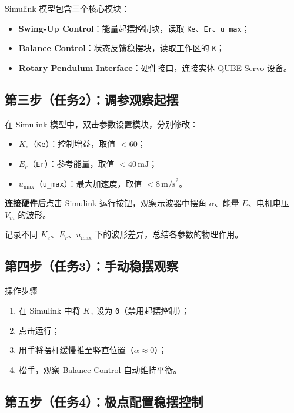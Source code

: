 \documentclass[12pt, a4paper]{article}
\begin{document}
Simulink 模型包含三个核心模块：
\begin{itemize}
    \item \textbf{Swing-Up Control}：能量起摆控制块，读取 \texttt{Ke}、\texttt{Er}、\texttt{u\_max}；
    \item \textbf{Balance Control}：状态反馈稳摆块，读取工作区的 \texttt{K}；
    \item \textbf{Rotary Pendulum Interface}：硬件接口，连接实体 QUBE-Servo 设备。
\end{itemize}

\subsection{第三步（任务2）：调参观察起摆}

在 Simulink 模型中，双击参数设置模块，分别修改：
\begin{itemize}
    \item $K_e$（\texttt{Ke}）：控制增益，取值 $< 60$；
    \item $E_r$（\texttt{Er}）：参考能量，取值 $< 40\,\text{mJ}$；
    \item $u_\text{max}$（\texttt{u\_max}）：最大加速度，取值 $< 8\,\text{m/s}^2$。
\end{itemize}

\textbf{连接硬件后}点击 Simulink 运行按钮，观察示波器中摆角 $\alpha$、能量 $E$、电机电压 $V_m$ 的波形。

\begin{notebox}
记录不同 $K_e$、$E_r$、$u_\text{max}$ 下的波形差异，总结各参数的物理作用。
\end{notebox}

\subsection{第四步（任务3）：手动稳摆观察}

\begin{stepbox}{操作步骤}
\begin{enumerate}
    \item 在 Simulink 中将 $K_e$ 设为 \texttt{0}（禁用起摆控制）；
    \item 点击运行；
    \item 用手将摆杆缓慢推至竖直位置（$\alpha \approx 0$）；
    \item 松手，观察 Balance Control 自动维持平衡。
\end{enumerate}
\end{stepbox}

\subsection{第五步（任务4）：极点配置稳摆控制}
\end{document}
